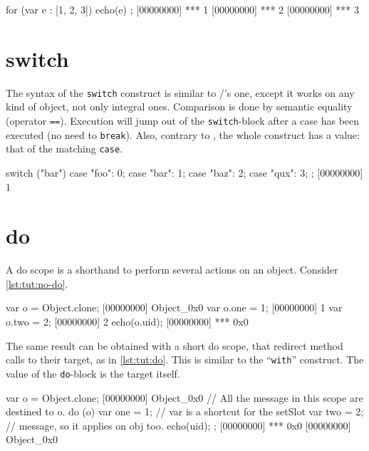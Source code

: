 \begin{urbiscript}[caption=Collection iteration with \lstinline{for},
label=lst:tut:for-in]
for (var e : [1, 2, 3]) { echo(e) };
[00000000] *** 1
[00000000] *** 2
[00000000] *** 3
\end{urbiscript}

\section{switch}

The syntax of the \lstinline|switch| construct is similar to \C/\Cxx's
one, except it works on any kind of object, not only integral
ones. Comparison is done by semantic equality (operator
\lstinline{==}). Execution will jump out of the
\lstinline|switch|-block after a case has been executed (no need to
\lstinline{break}).  Also, contrary to \Cxx, the whole construct has a
value: that of the matching \lstinline{case}.

\begin{urbiscript}[caption=The \lstinline{switch} construct, label=switch]
switch ("bar")
{
  case "foo":  0;
  case "bar":  1;
  case "baz":  2;
  case "qux":  3;
};
[00000000] 1
\end{urbiscript}

\section{do}
\label{section:constructs/do}

A do scope is a shorthand to perform several actions on an
object. Consider \autoref{lst:tut:no-do}.

\begin{urbiscript}[caption=Lot of code bloat,label=lst:tut:no-do]
var o = Object.clone;
[00000000] Object_0x0
var o.one = 1;
[00000000] 1
var o.two = 2;
[00000000] 2
echo(o.uid);
[00000000] *** 0x0
\end{urbiscript}

The same result can be obtained with a short do scope, that redirect
method calls to their target, as in \autoref{lst:tut:do}. This is
similar to the \pascal ``\lstinline{with}'' construct.  The value of
the \lstinline{do}-block is the target itself.

\begin{urbiscript}[caption=Shorter with a do block,label=lst:tut:do]
var o = Object.clone;
[00000000] Object_0x0
// All the message in this scope are destined to o.
do (o)
{
 var one = 1; // var is a shortcut for the setSlot
 var two = 2; // message, so it applies on obj too.
 echo(uid);
};
[00000000] *** 0x0
[00000000] Object_0x0
\end{urbiscript}


